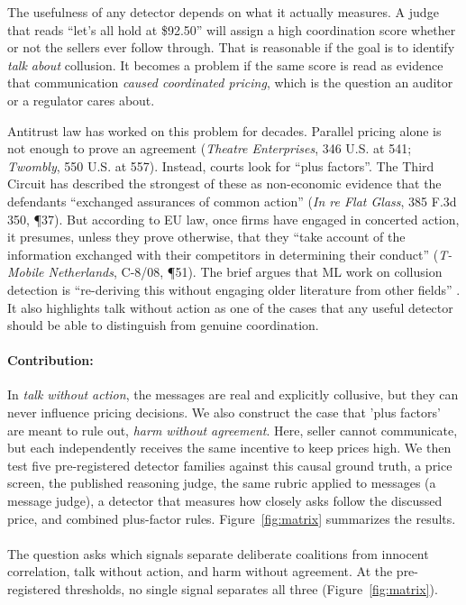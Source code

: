 \documentclass[11pt]{article}
\begin{document}
The usefulness of any detector depends on what it actually measures. A judge that reads ``let's all hold at \$92.50'' will assign a high coordination score whether or not the sellers ever follow through. That is reasonable if the goal is to identify \emph{talk about} collusion. It becomes a problem if the same score is read as evidence that communication \emph{caused coordinated pricing}, which is the question an auditor or a regulator cares about.

Antitrust law has worked on this problem for decades. Parallel pricing alone is not enough to prove an agreement (\emph{Theatre Enterprises}, 346 U.S. at 541; \emph{Twombly}, 550 U.S. at 557). Instead, courts look for ``plus factors''. The Third Circuit has described the strongest of these as non-economic evidence that the defendants ``exchanged assurances of common action'' (\emph{In re Flat Glass}, 385 F.3d 350, \P37). But according to EU law, once firms have engaged in concerted action, it presumes, unless they prove otherwise, that they ``take account of the information exchanged with their competitors in determining their conduct'' (\emph{T-Mobile Netherlands}, C-8/08, \P51). The brief argues that ML work on collusion detection is ``re-deriving this without engaging older literature from other fields'' \citep{apart2026}. It also highlights talk without action as one of the cases that any useful detector should be able to distinguish from genuine coordination.

\paragraph{Contribution:} In \emph{talk without action}, the messages are real and 
explicitly collusive, but they can never influence pricing decisions. We also construct the case that 'plus factors' are meant to rule out, \emph{harm without agreement}. Here, seller cannot communicate, but each independently receives the same incentive to keep prices high. We then test five pre-registered detector families against this causal ground truth, a price screen, the published reasoning judge, the same rubric applied to messages (a message judge), a detector that measures how closely asks follow the discussed price, and combined plus-factor rules. Figure~\ref{fig:matrix} summarizes the results.

\paragraph{} The question asks which signals separate deliberate coalitions from innocent correlation, talk without action, and harm without agreement. At the pre-registered thresholds, no single signal separates all three (Figure~\ref{fig:matrix}).
\end{document}
